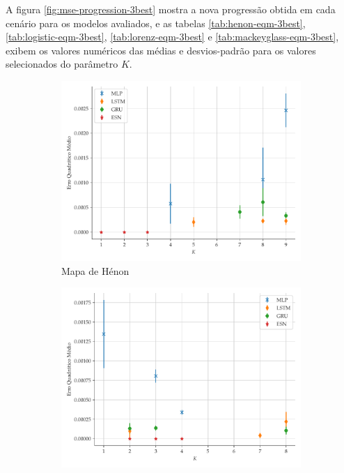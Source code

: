 \documentclass[a4paper, 12pt]{article}
\begin{document}
A figura \ref{fig:mse-progression-3best} mostra a nova progressão obtida em cada cenário para os modelos avaliados, e as tabelas \ref{tab:henon-eqm-3best}, \ref{tab:logistic-eqm-3best}, \ref{tab:lorenz-eqm-3best} e \ref{tab:mackeyglass-eqm-3best}, exibem os valores numéricos das médias e desvios-padrão para os valores selecionados do parâmetro $K$.
\begin{figure}[!ht]
     \begin{subfigure}[t]{0.49\textwidth} 
     \centering
         \includegraphics[scale=0.45]{henon-3best.pdf}
         \caption{Mapa de Hénon}
     \end{subfigure}
     \centering
     \begin{subfigure}[t]{0.49\textwidth} 
     \centering
         \includegraphics[scale=0.45]{logistic-3best.pdf}

\end{subfigure}
\end{figure}
\end{document}
